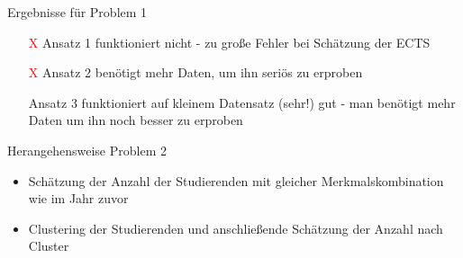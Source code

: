 \documentclass[17pt, fleqn]{beamer}
\begin{document}
\begin{frame}{Ergebnisse für Problem 1}
    \small{
    \begin{itemize}
        \item[\textcolor{red}{X}] Ansatz 1 funktioniert nicht - zu große Fehler bei Schätzung der ECTS \pause
        \item[\textcolor{red}{X}] Ansatz 2 benötigt mehr Daten, um ihn seriös zu erproben \pause
        \item[\textcolor{green}{\checkmark}] Ansatz 3 funktioniert auf kleinem Datensatz (sehr!) gut - man benötigt mehr Daten um ihn noch besser zu erproben
    \end{itemize}
    }
    
\end{frame}

\begin{frame}{Herangehensweise Problem 2}
    \begin{itemize}
        \item Schätzung der Anzahl der Studierenden mit gleicher Merkmalskombination wie im Jahr zuvor \\[1cm]
        \pause
        \item Clustering der Studierenden und anschließende Schätzung der Anzahl nach Cluster
    \end{itemize}
    
\end{frame}
\end{document}
